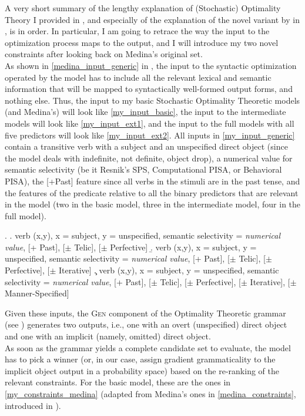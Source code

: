 A very short summary of the lengthy explanation of (Stochastic) Optimality Theory I provided in , and especially of the explanation of the novel variant by \textcite{Medina2007} in , is in order. In particular, I am going to retrace the way the input to the optimization process maps to the output, and I will introduce my two novel constraints after looking back on Medina's original set.\\
As shown in \ref{medina_input_generic} in , the input to the syntactic optimization operated by the model has to include all the relevant lexical and semantic information that will be mapped to syntactically well-formed output forms, and nothing else. Thus, the input to my basic Stochastic Optimality Theoretic models (and Medina's) will look like \ref{my_input_basic}, the input to the intermediate models will look like \ref{my_input_ext1}, and the input to the full models with all five predictors will look like \ref{my_input_ext2}. All inputs in \ref{my_input_generic} contain a transitive verb with a subject and an unspecified direct object (since the model deals with indefinite, not definite, object drop), a numerical value for semantic selectivity (be it Resnik's SPS, Computational PISA, or Behavioral PISA), the [+Past] feature since all verbs in the stimuli are in the past tense, and the features of the predicate relative to all the binary predictors that are relevant in the model (two in the basic model, three in the intermediate model, four in the full model).

\ex. \label{my_input_generic} 
\a. \label{my_input_basic} verb (x,y), x = subject, y = unspecified, semantic selectivity = \textit{numerical value}, [+ Past], [$\pm$ Telic], [$\pm$ Perfective]
\b. \label{my_input_ext1} verb (x,y), x = subject, y = unspecified, semantic selectivity = \textit{numerical value}, [+ Past], [$\pm$ Telic], [$\pm$ Perfective], [$\pm$ Iterative]
\c. \label{my_input_ext2} verb (x,y), x = subject, y = unspecified, semantic selectivity = \textit{numerical value}, [+ Past], [$\pm$ Telic], [$\pm$ Perfective], [$\pm$ Iterative], [$\pm$ Manner-Specified]

Given these inputs, the \textsc{Gen} component of the Optimality Theoretic grammar (see ) generates two outputs, i.e., one with an overt (unspecified) direct object and one with an implicit (namely, omitted) direct object.\\
As soon as the grammar yields a complete candidate set to evaluate, the model has to pick a winner (or, in our case, assign gradient grammaticality to the implicit object output in a probability space) based on the re-ranking of the relevant constraints. For the basic model, these are the ones in \ref{my_constraints_medina} (adapted from Medina's ones in \ref{medina_constraints}, introduced in ).

